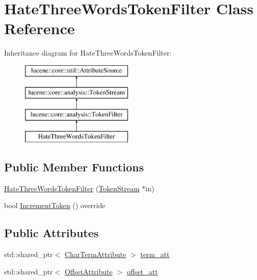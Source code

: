 \hypertarget{classHateThreeWordsTokenFilter}{}\section{Hate\+Three\+Words\+Token\+Filter Class Reference}
\label{classHateThreeWordsTokenFilter}
Inheritance diagram for Hate\+Three\+Words\+Token\+Filter\+:\begin{figure}[H]
\begin{center}
\leavevmode
\includegraphics[height=4.000000cm]{classHateThreeWordsTokenFilter}
\end{center}
\end{figure}
\subsection*{Public Member Functions}
\begin{DoxyCompactItemize}
\item 
\mbox{\hyperlink{classHateThreeWordsTokenFilter_a8be911badf576176b0168d86e33467c2}{Hate\+Three\+Words\+Token\+Filter}} (\mbox{\hyperlink{classlucene_1_1core_1_1analysis_1_1TokenStream}{Token\+Stream}} $\ast$in)
\item 
bool \mbox{\hyperlink{classHateThreeWordsTokenFilter_ad843fcf23da10776311702c619c02560}{Increment\+Token}} () override
\end{DoxyCompactItemize}
\subsection*{Public Attributes}
\begin{DoxyCompactItemize}
\item 
std\+::shared\+\_\+ptr$<$ \mbox{\hyperlink{classlucene_1_1core_1_1analysis_1_1tokenattributes_1_1CharTermAttribute}{Char\+Term\+Attribute}} $>$ \mbox{\hyperlink{classHateThreeWordsTokenFilter_a1474587e08f5c86b42c24badf44d7336}{term\+\_\+att}}
\item 
std\+::shared\+\_\+ptr$<$ \mbox{\hyperlink{classlucene_1_1core_1_1analysis_1_1tokenattributes_1_1OffsetAttribute}{Offset\+Attribute}} $>$ \mbox{\hyperlink{classHateThreeWordsTokenFilter_ab4f8e5cab969bbd844cff5ce59e78025}{offset\+\_\+att}}
\end{DoxyCompactItemize}
